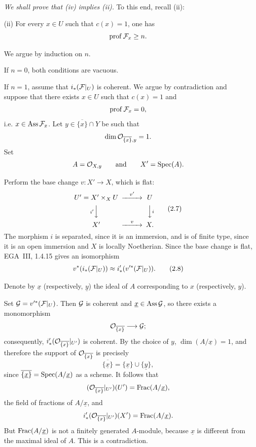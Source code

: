 \medskip
\noindent\textit{We shall prove that \textup{(iv)} implies
\textup{(ii)}.} To this end, recall \textup{(ii)}:

\medskip
\noindent\textup{(ii)} For every $x\in U$ such that $c(x)=1$, one has
\[
  \operatorname{prof}\cF_x\geq n.
\]

\noindent We argue by induction on $n$.

\medskip
\noindent If $n=0$, both conditions are vacuous.


\medskip
\noindent If $n=1$, assume that $i_*(\cF|_U)$ is coherent. We argue by
contradiction and suppose that there exists $x\in U$ such that $c(x)=1$ and
\[
  \prof\cF_x=0,
\]
i.e. $x\in\Ass\cF_x$. Let $y\in\overline{\{x\}}\cap Y$ be such that
\[
  \dim\mathcal O_{\overline{\{x\}},y}=1.
\]
Set
\[
  A=\mathcal O_{X,y}\qquad\text{and}\qquad X'=\operatorname{Spec}(A).
\]

\setcounter{equation}{6}
\noindent Perform the base change $v\colon X'\longrightarrow X$, which is
flat:
\begin{equation}
\begin{CD}
U'=X'\times_X U @>{v'}>> U\\
@V{i'}VV @VV{i}V\\
X' @>{v}>> X .
\end{CD}
\tag{2.7}\label{eq:VIII.2.7}
\end{equation}
The morphism $i$ is separated, since it is an immersion, and is of finite
type, since it is an open immersion and $X$ is locally Noetherian. Since the
base change is flat, EGA~III, 1.4.15 gives an isomorphism
\begin{equation}
  v^*(i_*(\cF|_U))
  \approx
  i'_*(v'^*(\cF|_U)).
\tag{2.8}\label{eq:VIII.2.8}
\end{equation}

\quad Denote by
$\underline{x}$ (respectively, $\underline{y}$) the ideal of $A$
corresponding to $x$ (respectively, $y$).

\medskip
\noindent Set $\cG=v'^*(\cF|_U)$. Then $\mathcal G$ is coherent and
$\underline{x}\in\operatorname{Ass}\mathcal G$, so there exists a monomorphism
\[
  \mathcal O_{\overline{\{x\}}}\longrightarrow\mathcal G;
\]
consequently, $i'_*(\mathcal O_{\overline{\{x\}}}|_{U'})$ is coherent. By the choice
of $y$, $\dim(A/\underline{x})=1$, and therefore the support of
$\mathcal O_{\overline{\{x\}}}$ is precisely
\[
  \overline{\{\underline{x}\}}
  =\{\underline{x}\}\cup\{\underline{y}\},
\]
since $\overline{\{\underline{x}\}}=\operatorname{Spec}(A/\underline{x})$ as a scheme. It
follows that
\[
  (\mathcal O_{\overline{\{x\}}}|_{U'})(U')
  =\operatorname{Frac}(A/\underline{x}),
\]
the field of fractions of $A/\underline{x}$, and
\[
  i'_*(\mathcal O_{\overline{\{x\}}}|_{U'})(X')
  =\operatorname{Frac}(A/\underline{x}).
\]
But $\operatorname{Frac}(A/\underline{x})$ is not a finitely generated $A$-module, because
$\underline{x}$ is different from the maximal ideal of $A$. This is a
contradiction.

